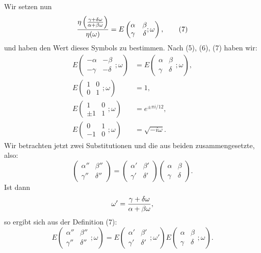 \documentclass[11pt]{article}
\begin{document}
Wir setzen nun
\begin{equation}
{\eta\left({\gamma+\delta\omega\over\alpha+\beta\omega}\right)\over\eta(\omega)}
=
E\left(\begin{matrix}\alpha&\beta\\ \gamma&\delta\end{matrix};\omega\right),
\tag{7}
\end{equation}
und haben den Wert dieses Symbols zu bestimmen. Nach (5), (6), (7) haben wir:
\begin{align}
E\left(\begin{matrix}-\alpha&-\beta\\-\gamma&-\delta\end{matrix};\omega\right)&=E\left(\begin{matrix}\alpha&\beta\\\gamma&\delta\end{matrix};\omega\right), \tag{8}\\
E\left(\begin{matrix}1&0\\0&1\end{matrix};\omega\right)&=1, \tag{9}\\
E\left(\begin{matrix}1&0\\ \pm1&1\end{matrix};\omega\right)&=e^{\pm\pi i/12}, \tag{10}\\
E\left(\begin{matrix}0&1\\-1&0\end{matrix};\omega\right)&=\sqrt{-i\omega}. \tag{11}
\end{align}
Wir betrachten jetzt zwei Substitutionen und die aus beiden zusammengesetzte, also:
\[
\begin{pmatrix}\alpha''&\beta''\\ \gamma''&\delta''\end{pmatrix}
=
\begin{pmatrix}\alpha'&\beta'\\ \gamma'&\delta'\end{pmatrix}
\begin{pmatrix}\alpha&\beta\\ \gamma&\delta\end{pmatrix}.
\]
Ist dann
\[
\omega'={\gamma+\delta\omega\over\alpha+\beta\omega},
\]
so ergibt sich aus der Definition (7):
\begin{equation}
E\left(\begin{matrix}\alpha''&\beta''\\ \gamma''&\delta''\end{matrix};\omega\right)
=E\left(\begin{matrix}\alpha'&\beta'\\ \gamma'&\delta'\end{matrix};\omega'\right)
 E\left(\begin{matrix}\alpha&\beta\\ \gamma&\delta\end{matrix};\omega\right).
\tag{12}
\end{equation}
\end{document}
